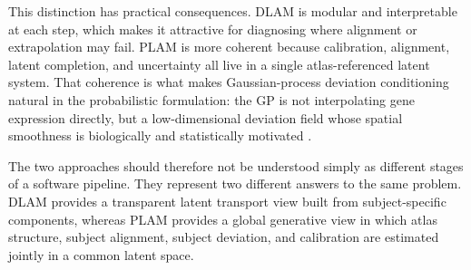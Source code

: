 \documentclass[11pt]{article}
\numberwithin{equation}{section}
\begin{document}
This distinction has practical consequences.  DLAM is modular and
interpretable at each step, which makes it attractive for diagnosing where alignment
or extrapolation may fail.  PLAM is more coherent because
calibration, alignment, latent completion, and uncertainty all live in a single
atlas-referenced latent system.  That coherence is what makes Gaussian-process
deviation conditioning natural in the probabilistic formulation: the GP is not
interpolating gene expression directly, but a low-dimensional deviation field whose
spatial smoothness is biologically and statistically motivated \cite{rasmussen2006gpml}.

The two approaches should therefore not be understood simply as different stages of a
software pipeline.  They represent two different answers to the same problem.  DLAM
provides a transparent latent transport view built from subject-specific components,
whereas PLAM provides a global
generative view in which atlas structure, subject alignment, subject deviation, and
calibration are estimated jointly in a common latent space.
\end{document}
